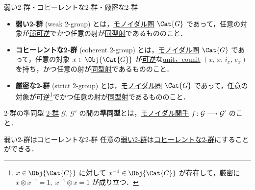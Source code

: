 \documentclass[TQFT_main]{subfiles}
\begin{document}
\begin{mydef}[label=def:W2G-C2G]{弱い2-群・コヒーレントな2-群・厳密な2-群}
    \begin{itemize}
        \item \textbf{弱い2-群} (weak 2-group) とは，\hyperref[redef:monoidal-category]{モノイダル圏} $\Cat{G}$ であって，任意の対象が\hyperref[def:weak-inverse]{弱可逆}でかつ任意の射が\hyperref[def:iso]{同型射}であるもののこと．
        \item \textbf{コヒーレントな2-群} (coherent 2-group) とは，\hyperref[redef:monoidal-category]{モノイダル圏} $\Cat{G}$ であって，任意の対象 $x \in \Obj{\Cat{G}}$ が\hyperref[def:iso]{可逆}な\hyperref[redef:dual]{unit，counit} $(x,\, \bar{x},\, i_x,\, e_x)$ を持ち，かつ任意の射が\hyperref[def:iso]{同型射}であるもののこと．
        \item \textbf{厳密な2-群} (strict 2-group) とは，\hyperref[redef:monoidal-category]{モノイダル圏} $\Cat{G}$ であって，任意の対象が可逆\footnote{$x \in \Obj{\Cat{C}}$ に対して $x^{-1} \in \Obj{\Cat{C}}$ が存在して，厳密に $x \otimes x^{-1} = 1,\; x^{-1} \otimes x = 1$ が成り立つ．}でかつ任意の射が\hyperref[def:iso]{同型射}であるもののこと．
    \end{itemize}
\end{mydef}

\begin{mydef}[label=def:hom2G]{2-群の準同型}
    \hyperref[def:W2G-C2G]{2-群} $\mathcal{G},\, \mathcal{G}'$ の間の\textbf{準同型}とは，\hyperref[redef:monidal-functor]{モノイダル関手} $f \colon \mathcal{G} \longrightarrow \mathcal{G}'$ のこと．
\end{mydef}

\begin{mytheo}[label=thm:W2G-C2G]{弱い2-群はコヒーレントな2-群}
    任意の\hyperref[def:W2G-C2G]{弱い2-群}は\hyperref[def:W2G-C2G]{コヒーレントな2-群}にすることができる．
\end{mytheo}
\end{document}
